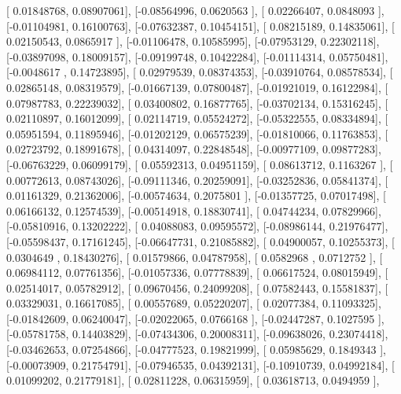 \documentclass{article}
\begin{document}
       [ 0.01848768,  0.08907061],
       [-0.08564996,  0.0620563 ],
       [ 0.02266407,  0.0848093 ],
       [-0.01104981,  0.16100763],
       [-0.07632387,  0.10454151],
       [ 0.08215189,  0.14835061],
       [ 0.02150543,  0.0865917 ],
       [-0.01106478,  0.10585995],
       [-0.07953129,  0.22302118],
       [-0.03897098,  0.18009157],
       [-0.09199748,  0.10422284],
       [-0.01114314,  0.05750481],
       [-0.0048617 ,  0.14723895],
       [ 0.02979539,  0.08374353],
       [-0.03910764,  0.08578534],
       [ 0.02865148,  0.08319579],
       [-0.01667139,  0.07800487],
       [-0.01921019,  0.16122984],
       [ 0.07987783,  0.22239032],
       [ 0.03400802,  0.16877765],
       [-0.03702134,  0.15316245],
       [ 0.02110897,  0.16012099],
       [ 0.02114719,  0.05524272],
       [-0.05322555,  0.08334894],
       [ 0.05951594,  0.11895946],
       [-0.01202129,  0.06575239],
       [-0.01810066,  0.11763853],
       [ 0.02723792,  0.18991678],
       [ 0.04314097,  0.22848548],
       [-0.00977109,  0.09877283],
       [-0.06763229,  0.06099179],
       [ 0.05592313,  0.04951159],
       [ 0.08613712,  0.1163267 ],
       [ 0.00772613,  0.08743026],
       [-0.09111346,  0.20259091],
       [-0.03252836,  0.05841374],
       [ 0.01161329,  0.21362006],
       [-0.00574634,  0.2075801 ],
       [-0.01357725,  0.07017498],
       [ 0.06166132,  0.12574539],
       [-0.00514918,  0.18830741],
       [ 0.04744234,  0.07829966],
       [-0.05810916,  0.13202222],
       [ 0.04088083,  0.09595572],
       [-0.08986144,  0.21976477],
       [-0.05598437,  0.17161245],
       [-0.06647731,  0.21085882],
       [ 0.04900057,  0.10255373],
       [ 0.0304649 ,  0.18430276],
       [ 0.01579866,  0.04787958],
       [ 0.0582968 ,  0.0712752 ],
       [ 0.06984112,  0.07761356],
       [-0.01057336,  0.07778839],
       [ 0.06617524,  0.08015949],
       [ 0.02514017,  0.05782912],
       [ 0.09670456,  0.24099208],
       [ 0.07582443,  0.15581837],
       [ 0.03329031,  0.16617085],
       [ 0.00557689,  0.05220207],
       [ 0.02077384,  0.11093325],
       [-0.01842609,  0.06240047],
       [-0.02022065,  0.0766168 ],
       [-0.02447287,  0.1027595 ],
       [-0.05781758,  0.14403829],
       [-0.07434306,  0.20008311],
       [-0.09638026,  0.23074418],
       [-0.03462653,  0.07254866],
       [-0.04777523,  0.19821999],
       [ 0.05985629,  0.1849343 ],
       [-0.00073909,  0.21754791],
       [-0.07946535,  0.04392131],
       [-0.10910739,  0.04992184],
       [ 0.01099202,  0.21779181],
       [ 0.02811228,  0.06315959],
       [ 0.03618713,  0.0494959 ],
\end{document}
